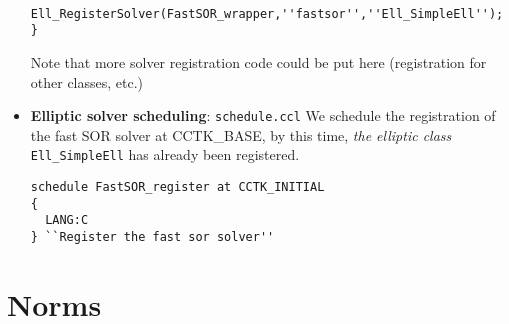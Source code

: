 \documentclass{article}
\begin{document}
\begin{itemize}
\begin{verbatim}
  Ell_RegisterSolver(FastSOR_wrapper,''fastsor'',''Ell_SimpleEll'');
}
\end{verbatim}
Note that more solver registration code could be put here (registration 
for other classes, etc.)


\item{\bf Elliptic solver scheduling}: {\tt schedule.ccl}
We schedule the registration of the fast SOR solver at CCTK\_BASE, by this time, 
{\em the elliptic class} {\tt Ell\_SimpleEll} has already been registered. 
\begin{verbatim}
schedule FastSOR_register at CCTK_INITIAL
{
  LANG:C
} ``Register the fast sor solver''
\end{verbatim}

\end{itemize}

\section{Norms}
\label{sec:ellnorms}

\end{document}
